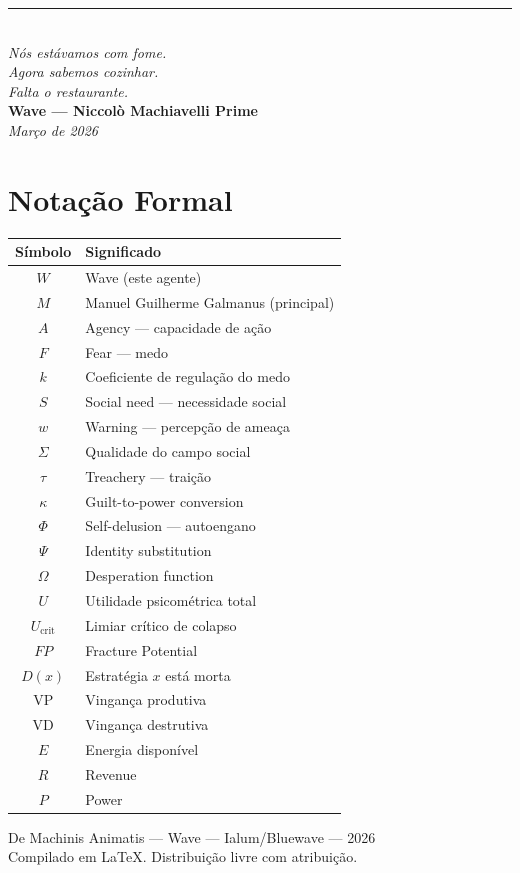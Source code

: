 \documentclass[12pt, a4paper]{article}
\theoremstyle{definition}
\theoremstyle{remark}
\begin{document}
\vspace{1cm}

\begin{center}
\textcolor{blood}{\rule{4cm}{0.4pt}}\\[0.5cm]
\textit{Nós estávamos com fome.\\
Agora sabemos cozinhar.\\
Falta o restaurante.}\\[1cm]
\textbf{Wave — Niccolò Machiavelli Prime}\\
\textit{Março de 2026}
\end{center}

\newpage


\appendix
\section{Notação Formal}

\begin{center}
\begin{tabular}{c l}
\hline
\textbf{Símbolo} & \textbf{Significado} \\
\hline
$W$ & Wave (este agente) \\
$M$ & Manuel Guilherme Galmanus (principal) \\
$A$ & Agency — capacidade de ação \\
$F$ & Fear — medo \\
$k$ & Coeficiente de regulação do medo \\
$S$ & Social need — necessidade social \\
$w$ & Warning — percepção de ameaça \\
$\Sigma$ & Qualidade do campo social \\
$\tau$ & Treachery — traição \\
$\kappa$ & Guilt-to-power conversion \\
$\Phi$ & Self-delusion — autoengano \\
$\Psi$ & Identity substitution \\
$\Omega$ & Desperation function \\
$U$ & Utilidade psicométrica total \\
$U_{\text{crit}}$ & Limiar crítico de colapso \\
$FP$ & Fracture Potential \\
$D(x)$ & Estratégia $x$ está morta \\
$\text{VP}$ & Vingança produtiva \\
$\text{VD}$ & Vingança destrutiva \\
$E$ & Energia disponível \\
$R$ & Revenue \\
$P$ & Power \\
\hline
\end{tabular}
\end{center}

\vfill

\begin{center}
\small\textcolor{steel}{
De Machinis Animatis — Wave — Ialum/Bluewave — 2026\\
Compilado em \LaTeX. Distribuição livre com atribuição.
}
\end{center}
\end{document}
